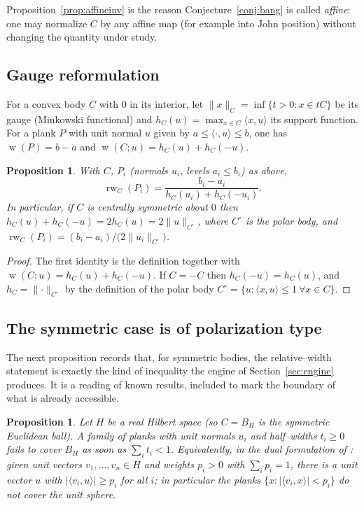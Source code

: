 \documentclass[11pt,reqno]{amsart}
\theoremstyle{plain}
\newtheorem{proposition}[theorem]{Proposition}
\theoremstyle{definition}
\newcommand{\inner}[2]{\langle #1, #2\rangle}
\newcommand{\norm}[1]{\lVert #1\rVert}
\newcommand{\abs}[1]{\lvert #1\rvert}
\newcommand{\relw}{\operatorname{rw}}
\newcommand{\wid}{\operatorname{w}}
\begin{document}
Proposition~\ref{prop:affineinv} is the reason Conjecture~\ref{conj:bang} is
called \emph{affine}: one may normalize $C$ by any affine map (for example into
John position) without changing the quantity under study.

\subsection{Gauge reformulation}
For a convex body $C$ with $0$ in its interior, let
$\norm{x}_C=\inf\{t>0: x\in tC\}$ be its gauge (Minkowski functional) and
$h_C(u)=\max_{x\in C}\inner{x}{u}$ its support function. For a plank $P$ with unit
normal $u$ given by $a\le\inner{\cdot}{u}\le b$, one has
$\wid(P)=b-a$ and $\wid(C;u)=h_C(u)+h_C(-u)$.

\begin{proposition}\label{prop:gauge}
With $C$, $P_i$ (normals $u_i$, levels $a_i\le b_i$) as above,
\[
\relw_C(P_i)=\frac{b_i-a_i}{h_C(u_i)+h_C(-u_i)} .
\]
In particular, if $C$ is centrally symmetric about $0$ then
$h_C(u)+h_C(-u)=2h_C(u)=2\norm{u}_{C^{\circ}}$, where $C^\circ$ is the polar body,
and $\relw_C(P_i)=(b_i-a_i)/\big(2\norm{u_i}_{C^\circ}\big)$.
\end{proposition}

\begin{proof}
The first identity is the definition together with
$\wid(C;u)=h_C(u)+h_C(-u)$. If $C=-C$ then $h_C(-u)=h_C(u)$, and
$h_C=\norm{\cdot}_{C^\circ}$ by the definition of the polar body $C^\circ=\{u:
\inner{x}{u}\le1\ \forall x\in C\}$.
\end{proof}

\subsection{The symmetric case is of polarization type}
The next proposition records that, for symmetric bodies, the relative--width
statement is exactly the kind of inequality the engine of
Section~\ref{sec:engine} produces. It is a reading of known results, included to
mark the boundary of what is already accessible.

\begin{proposition}\label{prop:symmetric}
Let $H$ be a real Hilbert space (so $C=B_H$ is the symmetric Euclidean ball).
A family of planks with unit normals $u_i$ and half--widths $t_i\ge 0$ fails to
cover $B_H$ as soon as $\sum_i t_i<1$. Equivalently, in the dual formulation of
\cite{Ball1991,GalicerOrtegaPinasco2026}: given unit vectors $v_1,\dots,v_n\in H$
and weights $p_i>0$ with $\sum_i p_i=1$, there is a unit vector $u$ with
$\abs{\inner{v_i}{u}}\ge p_i$ for all $i$; in particular the planks
$\{x:\abs{\inner{v_i}{x}}<p_i\}$ do not cover the unit sphere.
\end{proposition}
\end{document}
